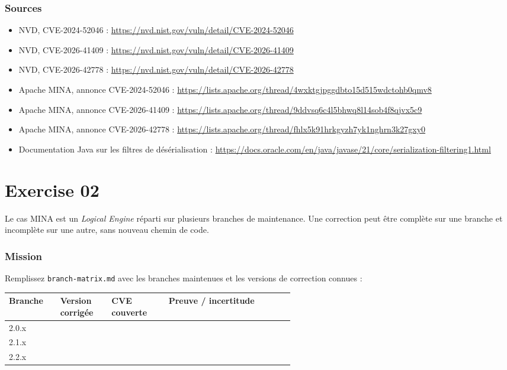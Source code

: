 \documentclass{training}
\begin{document}
\subsection*{Sources}
\begin{itemize}
  \item NVD, CVE-2024-52046 :
        \url{https://nvd.nist.gov/vuln/detail/CVE-2024-52046}
  \item NVD, CVE-2026-41409 :
        \url{https://nvd.nist.gov/vuln/detail/CVE-2026-41409}
  \item NVD, CVE-2026-42778 :
        \url{https://nvd.nist.gov/vuln/detail/CVE-2026-42778}
  \item Apache MINA, annonce CVE-2024-52046 :
        \url{https://lists.apache.org/thread/4wxktgjpggdbto15d515wdctohb0qmv8}
  \item Apache MINA, annonce CVE-2026-41409 :
        \url{https://lists.apache.org/thread/9ddvsq6c4l5bhwq8l14sob4f8qjvx5c9}
  \item Apache MINA, annonce CVE-2026-42778 :
        \url{https://lists.apache.org/thread/fhlx5k91hrkgyzh7yk1nghrn3k27gxy0}
  \item Documentation Java sur les filtres de désérialisation :
        \url{https://docs.oracle.com/en/java/javase/21/core/serialization-filtering1.html}
\end{itemize}

\chapter{Exercise 02}
\makeheaderfiles

Le cas MINA est un \emph{Logical Engine} réparti sur plusieurs branches de
maintenance. Une correction peut être complète sur une branche et incomplète
sur une autre, sans nouveau chemin de code.

\subsection*{Mission}

Remplissez \texttt{branch-matrix.md} avec les branches maintenues et les
versions de correction connues :

\begin{center}
\begin{tabularx}{\linewidth}{|p{0.18\linewidth}|p{0.18\linewidth}|p{0.2\linewidth}|X|}
\hline
\textbf{Branche} & \textbf{Version corrigée} & \textbf{CVE couverte} &
\textbf{Preuve / incertitude} \\ \hline
2.0.x & & & \\ \hline
2.1.x & & & \\ \hline
2.2.x & & & \\ \hline
\end{tabularx}
\end{center}
\end{document}
